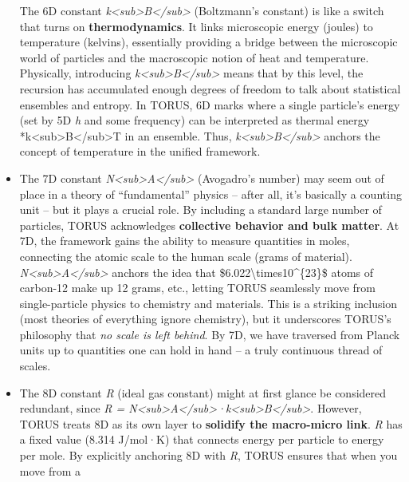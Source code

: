 \documentclass[
]{article}
\begin{document}
\begin{itemize}
  The 6D constant
  \emph{k\textless sub\textgreater B\textless/sub\textgreater{}}
  (Boltzmann's constant) is like a switch that turns on
  \textbf{thermodynamics}. It links microscopic energy (joules) to
  temperature (kelvins), essentially providing a bridge between the
  microscopic world of particles and the macroscopic notion of heat and
  temperature. Physically, introducing
  \emph{k\textless sub\textgreater B\textless/sub\textgreater{}} means
  that by this level, the recursion has accumulated enough degrees of
  freedom to talk about statistical ensembles and entropy. In TORUS, 6D
  marks where a single particle's energy (set by 5D \emph{h} and some
  frequency) can be interpreted as thermal energy
  *k\textless sub\textgreater B\textless/sub\textgreater T in an
  ensemble. Thus,
  \emph{k\textless sub\textgreater B\textless/sub\textgreater{}} anchors
  the concept of temperature in the unified framework.
\item
  The 7D constant
  \emph{N\textless sub\textgreater A\textless/sub\textgreater{}}
  (Avogadro's number) may seem out of place in a theory of
  ``fundamental'' physics -- after all, it's basically a counting unit
  -- but it plays a crucial role. By including a standard large number
  of particles, TORUS acknowledges \textbf{collective behavior and bulk
  matter}. At 7D, the framework gains the ability to measure quantities
  in moles, connecting the atomic scale to the human scale (grams of
  material).
  \emph{N\textless sub\textgreater A\textless/sub\textgreater{}} anchors
  the idea that \$6.022\textbackslash times10\^{}\{23\}\$ atoms of
  carbon-12 make up 12 grams, etc., letting TORUS seamlessly move from
  single-particle physics to chemistry and materials. This is a striking
  inclusion (most theories of everything ignore chemistry), but it
  underscores TORUS's philosophy that \emph{no scale is left behind}. By
  7D, we have traversed from Planck units up to quantities one can hold
  in hand -- a truly continuous thread of scales\hspace{0pt}.
\item
  The 8D constant \emph{R} (ideal gas constant) might at first glance be
  considered redundant, since \emph{R =
  N\textless sub\textgreater A\textless/sub\textgreater·k\textless sub\textgreater B\textless/sub\textgreater{}}.
  However, TORUS treats 8D as its own layer to \textbf{solidify the
  macro-micro link}. \emph{R} has a fixed value (8.314 J/mol·K) that
  connects energy per particle to energy per mole. By explicitly
  anchoring 8D with \emph{R}, TORUS ensures that when you move from a

\end{itemize}
\end{document}
